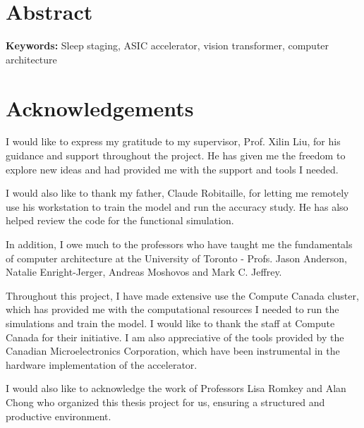\documentclass[12pt, hidelinks]{article}
\begin{document}

\maketitle



\onehalfspacing


\newpage

\section*{Abstract}
    \lipsum[1]
\newline
\newline
{\bf Keywords:} Sleep staging, ASIC accelerator, vision transformer, computer architecture
\newpage

\section*{Acknowledgements}
I would like to express my gratitude to my supervisor, Prof. Xilin Liu, for his guidance and support throughout the project. He has given me the freedom to explore new ideas and had provided me with the
support and tools I needed.

I would also like to thank my father, Claude Robitaille, for letting me remotely use his workstation to train the model and run the accuracy study. He has also helped review the code for the functional simulation.

In addition, I owe much to the professors who have taught me the fundamentals of computer architecture at the University of Toronto - Profs. Jason Anderson, Natalie Enright-Jerger, Andreas Moshovos and Mark C. Jeffrey.

Throughout this project, I have made extensive use the Compute Canada cluster, which has provided me with the computational resources I needed to run the simulations and train the model. I would like to thank the 
staff at Compute Canada for their initiative. I am also appreciative of the tools provided by the Canadian Microelectronics Corporation, which have been instrumental in the hardware implementation of the accelerator.

I would also like to acknowledge the work of Professors Lisa Romkey and Alan Chong who organized this thesis project for us, ensuring a structured and productive environment.
\end{document}
